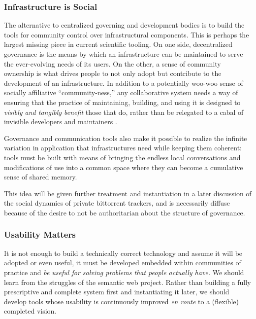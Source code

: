 \documentclass[10pt]{article}
\begin{document}
\begin{multicols}{2}
\hypertarget{infrastructure-is-social}{%
\subsubsection{Infrastructure is
Social}\label{infrastructure-is-social}}

The alternative to centralized governing and development bodies is to
build the tools for community control over infrastructural components.
This is perhaps the largest missing piece in current scientific tooling.
On one side, decentralized governance is the means by which an
infrastructure can be maintained to serve the ever-evolving needs of its
users. On the other, a sense of community ownership is what drives
people to not only adopt but contribute to the development of an
infrastructure. In addition to a potentially woo-woo sense of socially
affiliative ``community-ness,'' any collaborative system needs a way of
ensuring that the practice of maintaining, building, and using it is
designed to \emph{visibly and tangibly benefit} those that do, rather
than be relegated to a cabal of invisible developers and maintainers
\cite{grudinGroupwareSocialDynamics1994, randallDistributedOntologyBuilding2011} .

Governance and communication tools also make it possible to realize the
infinite variation in application that infrastructures need while
keeping them coherent: tools must be built with means of bringing the
endless local conversations and modifications of use into a common space
where they can become a cumulative sense of shared memory.

This idea will be given further treatment and instantiation in a later
discussion of the social dynamics of private bittorrent trackers, and is
necessarily diffuse because of the desire to not be authoritarian about
the structure of governance.

\hypertarget{usability-matters}{%
\subsubsection{Usability Matters}\label{usability-matters}}

It is not enough to build a technically correct technology and assume it
will be adopted or even useful, it must be developed embedded within
communities of practice and \emph{be useful for solving problems that
people actually have.} We should learn from the struggles of the
semantic web project. Rather than building a fully prescriptive and
complete system first and instantiating it later, we should develop
tools whose usability is continuously improved \emph{en route} to a
(flexible) completed vision.


\end{multicols}
\end{document}
